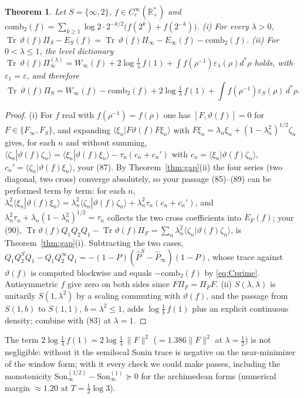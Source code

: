 \documentclass[11pt]{amsart}
\newtheorem{theorem}{Theorem}[section]
\theoremstyle{definition}
\theoremstyle{remark}
\newcommand{\R}{\mathbb R}
\newcommand{\Tr}{\operatorname{Tr}}
\newcommand{\Son}{\mathrm{Son}}
\newcommand{\Pih}{\widehat P}
\begin{document}
\begin{theorem}\label{thm:84}
Let $S=\{\infty,2\}$, $f\in C_c^\infty(\R_+^*)$ and $\mathrm{comb}_2(f)=\sum_{k\ge1}\log2\cdot2^{-k/2}\big(f(2^k)+f(2^{-k})\big)$.
\emph{(i)} For every $\lambda>0$,
$\Tr\,\vartheta(f)\Pi_S-E_S(f)=\Tr\,\vartheta(f)\Pi_\infty-E_\infty(f)-\mathrm{comb}_2(f)$.
\emph{(ii)} For $0<\lambda\le1$, the level dictionary
$\Tr\,\vartheta(f)\Pi_\infty^{(\lambda)}=W_\infty(f)+2\log\tfrac1\lambda\,f(1)+\int f(\rho^{-1})\varepsilon_\lambda(\rho)d^*\rho$ holds,
with $\varepsilon_1=\varepsilon$, and therefore
\[
\Tr\,\vartheta(f)\Pi_S=W_\infty(f)-\mathrm{comb}_2(f)+2\log\tfrac1\lambda\,f(1)+\int f(\rho^{-1})\varepsilon_S(\rho)\,d^*\rho .
\]
\end{theorem}
\begin{proof}
(i) For $f$ real with $f(\rho^{-1})=f(\rho)$ one has $[F,\vartheta(f)]=0$ for $F\in\{F_\infty,F_S\}$, and expanding
$\langle\xi_n|F\vartheta(f)F\xi_n\rangle$ with $F\xi_n=\lambda_n\xi_n+(1-\lambda_n^2)^{1/2}\zeta_n$ gives, for each $n$ and without
summing, $\langle\zeta_n|\vartheta(f)\zeta_n\rangle=\langle\xi_n|\vartheta(f)\xi_n\rangle-\tau_n(c_n+c_n')$ with $c_n=\langle\xi_n|\vartheta(f)\zeta_n\rangle$, $c_n'=\langle\zeta_n|\vartheta(f)\xi_n\rangle$, your (87). By Theorem~\ref{thm:gap}(ii) the four series (two diagonal, two cross) converge absolutely, so your passage (85)--(89) can be performed term by term: for each $n$, $\lambda_n^2\langle\xi_n|\vartheta(f)\xi_n\rangle=\lambda_n^2\langle\zeta_n|\vartheta(f)\zeta_n\rangle+\lambda_n^2\tau_n(c_n+c_n')$, and $\lambda_n^2\tau_n+\lambda_n(1-\lambda_n^2)^{1/2}=\tau_n$ collects the two cross coefficients into $E_F(f)$; your (90), $\Tr\vartheta(f)Q_1Q_2Q_1-\Tr\vartheta(f)\Pi_F=\sum_n\lambda_n^2\langle\zeta_n|\vartheta(f)\zeta_n\rangle$, is Theorem~\ref{thm:gap}(i).
Subtracting the two cases, $Q_1Q_2^SQ_1-Q_1Q_2^\infty Q_1=-(1-P)(\Pih^S-\Pih_\infty)(1-P)$, whose trace against $\vartheta(f)$ is
computed blockwise and equals $-\mathrm{comb}_2(f)$ by \eqref{eq:Cprime}. Antisymmetric $f$ give zero on both sides since
$F\Pi_F=\Pi_FF$. (ii) $S(\lambda,\lambda)$ is unitarily $S(1,\lambda^2)$ by a scaling commuting with $\vartheta(f)$, and the
passage from $S(1,b)$ to $S(1,1)$, $b=\lambda^2\le1$, adds $\log\frac1b\,f(1)$ plus an explicit continuous density; combine with
(83) at $\lambda=1$.
\end{proof}

The term $2\log\frac1\lambda\,f(1)=2\log\frac1\lambda\,\|F\|^2$ ($=1.386\|F\|^2$ at $\lambda=\frac12$) is not negligible: without it the semilocal Sonin trace is negative on the near-minimizer of the window form; with it every check we could make passes, including the monotonicity
$\Son_\infty^{(1/2)}-\Son_\infty^{(1)}\succeq0$ for the archimedean forms (numerical margin $\approx1.20$ at $T=\frac12\log3$).
\end{document}
